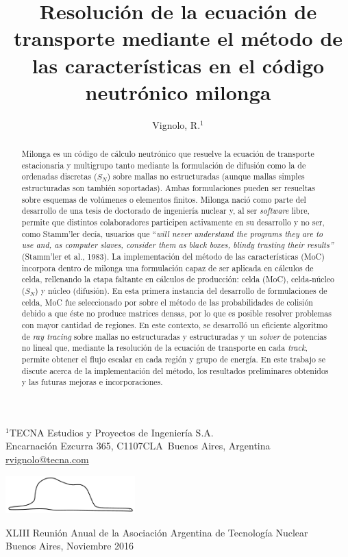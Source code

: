 \documentclass[11pt]{article}
\makeatletter
\def\affiliation#1{\def\@affiliation{#1}}
\def\maketitle{%
\thispagestyle{empty}

\newlength{\coff}
\setlength{\coff}{0.3cm}

\null
\vspace{0.5cm plus 0.5cm minus 0.5cm}

\begin{center}
\begin{minipage}{0.8\linewidth}
\begin{center}
\Large{\textbf{\textsc{\@title}}}

\vspace{0.75cm plus 0.2cm minus 0.1cm}

\large{\@author}

\vspace{1.25cm plus 0.25cm minus 0.25cm}

\small{\@affiliation}
\vspace{1cm plus 0.2cm minus 0.2cm}

\end{center}
\end{minipage}
\end{center}

}
\makeatother
\begin{document}
\title{Resolución de la ecuación de transporte mediante el método de las características en el código neutrónico milonga}
\author{Vignolo, R.$^{1}$}
\affiliation{%
$^1$TECNA Estudios y Proyectos de Ingeniería S.A.\\
Encarnaci\'on Ezcurra 365, C1107CLA~Buenos Aires, Argentina\\
\url{rvignolo@tecna.com}\\
}


\maketitle


\begin{abstract}
\noindent
Milonga es un código de cálculo neutrónico que resuelve la ecuación de transporte estacionaria y multigrupo tanto mediante la formulación de difusión como la de ordenadas discretas ($S_N$) sobre mallas no estructuradas (aunque mallas simples estructuradas son también soportadas). Ambas formulaciones pueden ser resueltas sobre esquemas de volúmenes o elementos finitos. Milonga nació como parte del desarrollo de una tesis de doctorado de ingeniería nuclear y, al ser \emph{software} libre, permite que distintos colaboradores participen activamente en su desarrollo y no ser, como Stamm'ler decía, usuarios que ``\emph{will never understand the programs they are to use and, as computer slaves, consider them as black boxes, blindy trusting their results''} (Stamm'ler et al., 1983). La implementación del método de las características (MoC) incorpora dentro de milonga una formulación capaz de ser aplicada en cálculos de celda, rellenando la etapa faltante en cálculos de producción: celda (MoC), celda-núcleo ($S_N$) y núcleo (difusión). En esta primera instancia del desarrollo de formulaciones de celda, MoC fue seleccionado por sobre el método de las probabilidades de colisión debido a que éste no produce matrices densas, por lo que es posible resolver problemas con mayor cantidad de regiones. En este contexto, se desarrolló un eficiente algoritmo de \emph{ray tracing} sobre mallas no estructuradas y estructuradas y un \emph{solver} de potencias no lineal que, mediante la resolución de la ecuación de transporte en cada \emph{track}, permite obtener el flujo escalar en cada región y grupo de energía. En este trabajo se discute acerca de la implementación del método, los resultados preliminares obtenidos y las futuras mejoras e incorporaciones.
\end{abstract}

\vfill

\begin{center}
\includegraphics[width=5cm]{vibora-blanca-sola.pdf}
\end{center}

\vfill

\begin{center}
\begin{small}
XLIII Reunión Anual de la Asociación Argentina de Tecnología Nuclear\\
Buenos Aires, Noviembre 2016
\end{small}
\end{center}

\addtolength{\textheight}{-2cm}
\end{document}
